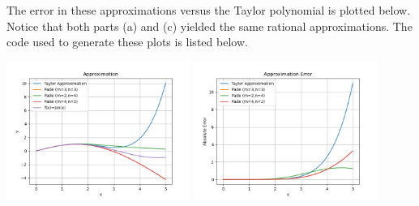 \documentclass[10pt]{article}
\begin{document}
\begin{enumerate}
\begin{enumerate}
      The error in these approximations versus the Taylor polynomial is plotted below. Notice that both parts (a) and (c) yielded the same rational approximations. The code used to generate these plots is listed below.

      \begin{center}
        \includegraphics[width=0.45\textwidth]{pade.png}
        \includegraphics[width=0.45\textwidth]{pade_error.png}
      \end{center}
    \end{enumerate}

    {\small }


\end{enumerate}
\end{document}
